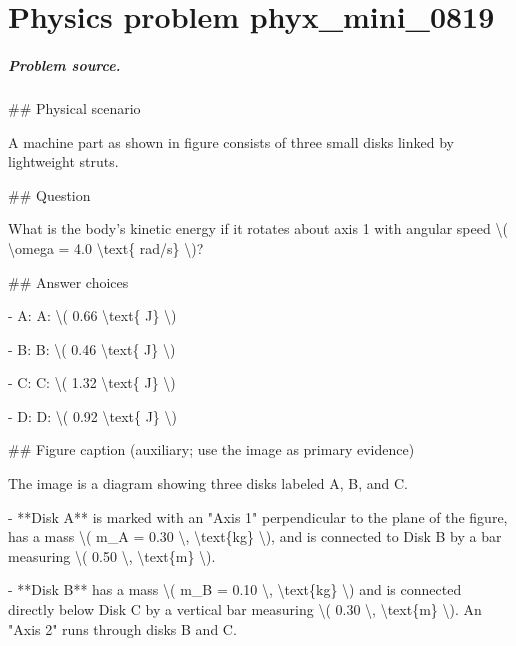 
\chapter{Physics problem phyx\_mini\_0819}
\label{ch:PhyXMiniProblems_problem_phyx_mini_0819}

\paragraph{Problem source.}
\#\# Physical scenario

A machine part as shown in figure consists of three small disks linked by lightweight struts.

\#\# Question

What is the body's kinetic energy if it rotates about axis 1 with angular speed \textbackslash{}( \textbackslash{}omega = 4.0 \textbackslash{}text\{ rad/s\} \textbackslash{})?

\#\# Answer choices

- A: A: \textbackslash{}( 0.66 \textbackslash{}text\{ J\} \textbackslash{})

- B: B: \textbackslash{}( 0.46 \textbackslash{}text\{ J\} \textbackslash{})

- C: C: \textbackslash{}( 1.32 \textbackslash{}text\{ J\} \textbackslash{})

- D: D: \textbackslash{}( 0.92  \textbackslash{}text\{ J\} \textbackslash{})

\#\# Figure caption (auxiliary; use the image as primary evidence)

The image is a diagram showing three disks labeled A, B, and C. 

- **Disk A** is marked with an "Axis 1" perpendicular to the plane of the figure, has a mass \textbackslash{}( m\_A = 0.30 \textbackslash{}, \textbackslash{}text\{kg\} \textbackslash{}), and is connected to Disk B by a bar measuring \textbackslash{}( 0.50 \textbackslash{}, \textbackslash{}text\{m\} \textbackslash{}).
  
- **Disk B** has a mass \textbackslash{}( m\_B = 0.10 \textbackslash{}, \textbackslash{}text\{kg\} \textbackslash{}) and is connected directly below Disk C by a vertical bar measuring \textbackslash{}( 0.30 \textbackslash{}, \textbackslash{}text\{m\} \textbackslash{}). An "Axis 2" runs through disks B and C.
  

